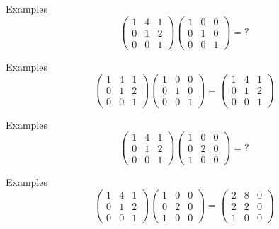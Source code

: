 \documentclass{beamer}
\begin{document}
\begin{frame}{Examples}
   \[
\begin{pmatrix}
1 & 4 & 1 \\
0 & 1 & 2 \\
0 & 0 & 1
\end{pmatrix}
\begin{pmatrix}
1 & 0 & 0 \\
0 & 1 & 0 \\
0 & 0 & 1
\end{pmatrix}
    =\text{?} 
\] 
\end{frame}

\begin{frame}{Examples}
   \[
\begin{pmatrix}
1 & 4 & 1 \\
0 & 1 & 2 \\
0 & 0 & 1
\end{pmatrix}
\begin{pmatrix}
1 & 0 & 0 \\
0 & 1 & 0 \\
0 & 0 & 1
\end{pmatrix}
    =
\begin{pmatrix}
1 & 4 & 1 \\
0 & 1 & 2 \\
0 & 0 & 1
\end{pmatrix}
\] 
\end{frame}



\begin{frame}{Examples}
   \[
\begin{pmatrix}
1 & 4 & 1 \\
0 & 1 & 2 \\
0 & 0 & 1
\end{pmatrix}
\begin{pmatrix}
1 & 0 & 0 \\
0 & 2 & 0 \\
1 & 0 & 0
\end{pmatrix}
    =\text{?} 
\] 
\end{frame}

\begin{frame}{Examples}
   \[
\begin{pmatrix}
1 & 4 & 1 \\
0 & 1 & 2 \\
0 & 0 & 1
\end{pmatrix}
\begin{pmatrix}
1 & 0 & 0 \\
0 & 2 & 0 \\
1 & 0 & 0
\end{pmatrix}
    =
\begin{pmatrix}
2 & 8 & 0 \\
2 & 2 & 0 \\
1 & 0 & 0
\end{pmatrix}
\] 
\end{frame}
\end{document}
